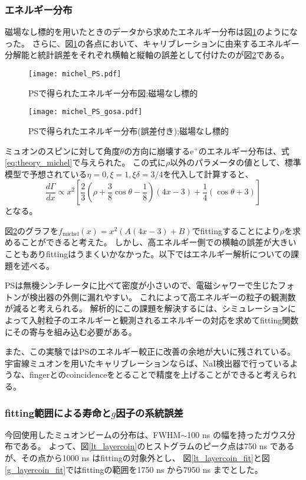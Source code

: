 \subsubsection{エネルギー分布}
磁場なし標的を用いたときのデータから求めたエネルギー分布は図\ref{michel_PS}のようになった。
さらに、図\ref{michel_PS}の各点において、キャリブレーションに由来するエネルギー分解能と統計誤差をそれぞれ横軸と縦軸の誤差として付けたのが図\ref{michel_PS_gosa}である。
\begin{figure}[H]
\centering
\texttt{[image: michel\_PS.pdf]}
\caption{PSで得られたエネルギー分布図;磁場なし標的}
\label{michel_PS}
\end{figure}

\begin{figure}[H]
\centering
\texttt{[image: michel\_PS\_gosa.pdf]}
\caption{PSで得られたエネルギー分布(誤差付き);磁場なし標的}
\label{michel_PS_gosa}
\end{figure}

ミュオンのスピンに対して角度$\theta$の方向に崩壊する$\mathrm{e}^{+}$のエネルギー分布は、式\ref{eq:theory_michel}で与えられた。
この式に$\rho$以外のパラメータの値として、標準模型で予想されている$\eta = 0 , \xi = 1 , \xi \delta = 3/4$を代入して計算すると、
\begin{equation*}
\frac{d\Gamma}{dx} \propto x^{2} [\frac{2}{3}(\rho + \frac{3}{8}\cos \theta - \frac{1}{8})(4x-3) + \frac{1}{4}(\cos \theta + 3)]
\end{equation*}
となる。

図\ref{michel_PS_gosa}のグラフを$f_{\mathrm{michel}}(x) = x^{2} (A(4x -3) + B)$でfittingすることにより$\rho$を求めることができると考えた。
しかし、高エネルギー側での横軸の誤差が大きいこともありfittingはうまくいかなかった。以下ではエネルギー解析についての課題を述べる。

PSは無機シンチレータに比べて密度が小さいので、電磁シャワーで生じたフォトンが検出器の外側に漏れやすい。
これによって高エネルギーの粒子の観測数が減ると考えられる。
解析的にこの課題を解決するには、シミュレーションによって入射粒子のエネルギーと観測されるエネルギーの対応を求めてfitting関数にその寄与を組み込む必要がある。

また、この実験ではPSのエネルギー較正に改善の余地が大いに残されている。
宇宙線ミュオンを用いたキャリブレーションならば、NaI検出器で行っているような、fingerとのcoincidenceをとることで精度を上げることができると考えられる。

\subsubsection{fitting範囲による寿命と$g$因子の系統誤差}
今回使用したミュオンビームの分布は、FWHM$\sim$100 ns の幅を持ったガウス分布である。
よって、図\ref{lt_layercoin}のヒストグラムのピーク点は750 ns であるが、その点から1000 ns はfittingの対象外とし、
図\ref{lt_layercoin_fit}と図\ref{g_layercoin_fit}ではfittingの範囲を1750 ns から7950 ns までとした。

